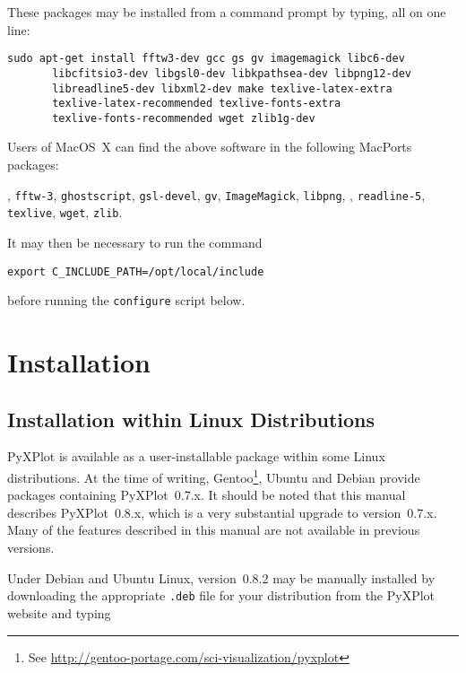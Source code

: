 \noindent These packages may be installed from a command prompt by typing, all on one line:

\begin{verbatim}
sudo apt-get install fftw3-dev gcc gs gv imagemagick libc6-dev
       libcfitsio3-dev libgsl0-dev libkpathsea-dev libpng12-dev
       libreadline5-dev libxml2-dev make texlive-latex-extra
       texlive-latex-recommended texlive-fonts-extra
       texlive-fonts-recommended wget zlib1g-dev
\end{verbatim}

Users of MacOS~X can find the above software in the following MacPorts packages:

\vspace{2mm}
, {\tt fftw-3}, {\tt ghostscript}, {\tt gsl-devel}, {\tt gv}, {\tt ImageMagick}, {\tt libpng},\newline
{}, {\tt readline-5}, {\tt texlive}, {\tt wget}, {\tt zlib}.
\vspace{2mm}

It may then be necessary to run the command
\begin{verbatim}
export C_INCLUDE_PATH=/opt/local/include
\end{verbatim}
before running the {\tt configure} script below.

\section{Installation}

\subsection{Installation within Linux Distributions}

PyXPlot is available as a user-installable package within some Linux
distributions. At the time of writing, Gentoo\footnote{See
\url{http://gentoo-portage.com/sci-visualization/pyxplot}}, Ubuntu and Debian provide packages containing
PyXPlot~0.7.x. It should be noted that this manual describes PyXPlot~0.8.x,
which is a very substantial upgrade to version~0.7.x. Many of the features
described in this manual are not available in previous versions.

Under Debian and Ubuntu Linux, version~0.8.2 may be manually installed by
downloading the appropriate {\tt .deb} file for your distribution from the
PyXPlot website and typing

